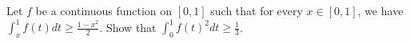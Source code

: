 Let $f$ be a continuous function on $[0,1]$ such that for every $x\in [0,1]$,
we have $\int_{x}^{1}f(t)dt \geq\frac{1-x^{2}}{2}$. Show that $\int_{0}^{1}f(t)^{2}dt \geq \frac{1}{3}$.